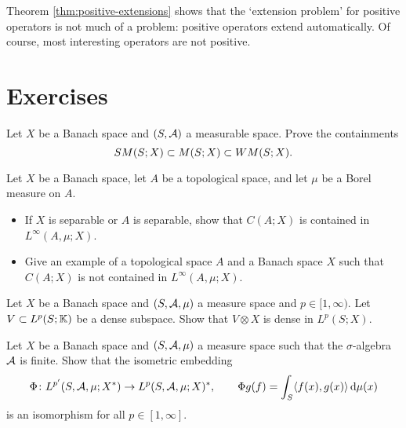 Theorem \ref{thm:positive-extensions} shows that the `extension problem' for positive operators is not much of a problem: positive operators extend automatically.
Of course, most interesting operators are not positive.

\begin{example}
\end{example}



\section*{Exercises}

\begin{exercise}\label{ex:measurability-containments}
  Let $X$ be a Banach space and $(S,\mathcal{A})$ a measurable space.
  Prove the containments
  \begin{equation*}
    SM(S;X) \subset M(S;X) \subset WM(S;X).
  \end{equation*}
\end{exercise}

\begin{exercise}
  Let $X$ be a Banach space, let $A$ be a topological space, and let $\mu$ be a Borel measure on $A$.
  \begin{itemize}
  \item If $X$ is separable or $A$ is separable, show that $C(A;X)$ is contained in $L^\infty(A, \mu;X)$.
  \item Give an example of a topological space $A$ and a Banach space $X$ such that $C(A;X)$ is not contained in $L^\infty(A,\mu;X)$.
  \end{itemize}
\end{exercise}

\begin{exercise}\label{ex:general-density}
  Let $X$ be a Banach space and $(S,\mathcal{A},\mu)$ a measure space and $p \in [1,\infty)$.
  Let $V \subset L^p(S;\mathbb{K})$ be a dense subspace.
  Show that $V \otimes X$ is dense in $L^p(S;X)$.
\end{exercise}

\begin{exercise}\label{ex:finite-sigma-alg-duality}
  Let $X$ be a Banach space and $(S,\mathcal{A},\mu)$ a measure space such that the $\sigma$-algebra $\mathcal{A}$ is finite.
  Show that the isometric embedding
  \begin{equation*}
    \Phi \colon L^{p'}(S,\mathcal{A},\mu;X^*) \rightarrow L^p(S,\mathcal{A},\mu;X)^*, \qquad \Phi g(f) = \int_S \langle f(x), g(x) \rangle \, \mathrm{d}\mu(x)
  \end{equation*}
  is an isomorphism for all $p \in [1,\infty]$.
\end{exercise}

